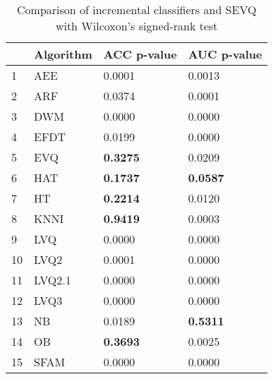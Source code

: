 \begin{table}[H]
\footnotesize
\centering
\caption{Comparison of incremental classifiers and SEVQ with Wilcoxon’s signed-rank test}
\label{tab:Incremental wilcoxon comparison}
\begin{tabular}{llll}
\hline
{} & Algorithm & ACC p-value &      AUC p-value \\
\hline
1  &       AEE &           0.0001 &           0.0013 \\
2  &       ARF &           0.0374 &           0.0001 \\
3  &       DWM &           0.0000 &           0.0000 \\
4  &      EFDT &           0.0199 &           0.0000 \\
5  &       EVQ &  \textbf{0.3275} &           0.0209 \\
6  &       HAT &  \textbf{0.1737} &  \textbf{0.0587} \\
7  &        HT &  \textbf{0.2214} &           0.0120 \\
8  &      KNNI &  \textbf{0.9419} &           0.0003 \\
9  &       LVQ &           0.0000 &           0.0000 \\
10 &      LVQ2 &           0.0001 &           0.0000 \\
11 &    LVQ2.1 &           0.0000 &           0.0000 \\
12 &      LVQ3 &           0.0000 &           0.0000 \\
13 &        NB &           0.0189 &  \textbf{0.5311} \\
14 &        OB &  \textbf{0.3693} &           0.0025 \\
15 &      SFAM &           0.0000 &           0.0000 \\
\hline
\end{tabular}
\end{table}
